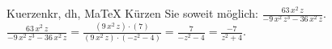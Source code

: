 \begin{MAufgabe}{Kuerzen}{kr, dh, MaTeX}
K\"urzen Sie soweit m\"oglich: $\frac{63\, x^2\, z}{ - 9\, x^2\, z^3 - 36\, x^2\, z}$.\\ 
\ifLsg\MLoesung
\quad $\frac{63\, x^2\, z}{ - 9\, x^2\, z^3 - 36\, x^2\, z}=\frac{(9\, x^2\, z)\cdot(7)}{(9\, x^2\, z)\cdot( - z^2 - 4)}=\frac{7}{ - z^2 - 4}=\frac{-7}{z^2 + 4}$.\else\relax\fi
 \end{MAufgabe}